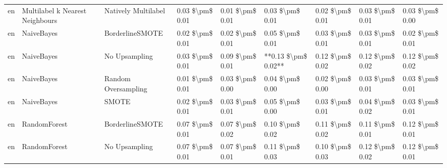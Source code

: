 \begin{tabular}{lllllllll}
      en & Multilabel k Nearest Neighbours &           Natively Multilabel & 0.03 \$\textbackslash pm\$ 0.01 &           0.01 \$\textbackslash pm\$ 0.01 &       0.03 \$\textbackslash pm\$ 0.01 &        0.02 \$\textbackslash pm\$ 0.01 &                         0.03 \$\textbackslash pm\$ 0.01 &     0.03 \$\textbackslash pm\$ 0.00 \\
      en &                      NaiveBayes &               BorderlineSMOTE & 0.02 \$\textbackslash pm\$ 0.01 &           0.02 \$\textbackslash pm\$ 0.01 &       0.05 \$\textbackslash pm\$ 0.01 &        0.03 \$\textbackslash pm\$ 0.01 &                         0.03 \$\textbackslash pm\$ 0.01 &     0.02 \$\textbackslash pm\$ 0.01 \\
      en &                      NaiveBayes &                 No Upsampling & 0.03 \$\textbackslash pm\$ 0.01 &           0.09 \$\textbackslash pm\$ 0.01 &   **0.13 \$\textbackslash pm\$ 0.02** &        0.12 \$\textbackslash pm\$ 0.02 &                         0.12 \$\textbackslash pm\$ 0.02 &     0.12 \$\textbackslash pm\$ 0.02 \\
      en &                      NaiveBayes &           Random Oversampling & 0.01 \$\textbackslash pm\$ 0.01 &           0.03 \$\textbackslash pm\$ 0.00 &       0.04 \$\textbackslash pm\$ 0.00 &        0.02 \$\textbackslash pm\$ 0.00 &                         0.03 \$\textbackslash pm\$ 0.01 &     0.03 \$\textbackslash pm\$ 0.01 \\
      en &                      NaiveBayes &                         SMOTE & 0.02 \$\textbackslash pm\$ 0.01 &           0.03 \$\textbackslash pm\$ 0.01 &       0.05 \$\textbackslash pm\$ 0.00 &        0.03 \$\textbackslash pm\$ 0.01 &                         0.04 \$\textbackslash pm\$ 0.02 &     0.03 \$\textbackslash pm\$ 0.01 \\
      en &                    RandomForest &               BorderlineSMOTE & 0.07 \$\textbackslash pm\$ 0.01 &           0.07 \$\textbackslash pm\$ 0.02 &       0.10 \$\textbackslash pm\$ 0.02 &        0.11 \$\textbackslash pm\$ 0.02 &                         0.11 \$\textbackslash pm\$ 0.01 &     0.12 \$\textbackslash pm\$ 0.01 \\
      en &                    RandomForest &                 No Upsampling & 0.07 \$\textbackslash pm\$ 0.01 &           0.07 \$\textbackslash pm\$ 0.01 &       0.11 \$\textbackslash pm\$ 0.03 &        0.10 \$\textbackslash pm\$ 0.03 &                         0.12 \$\textbackslash pm\$ 0.02 &     0.12 \$\textbackslash pm\$ 0.01 \\

\end{tabular}

